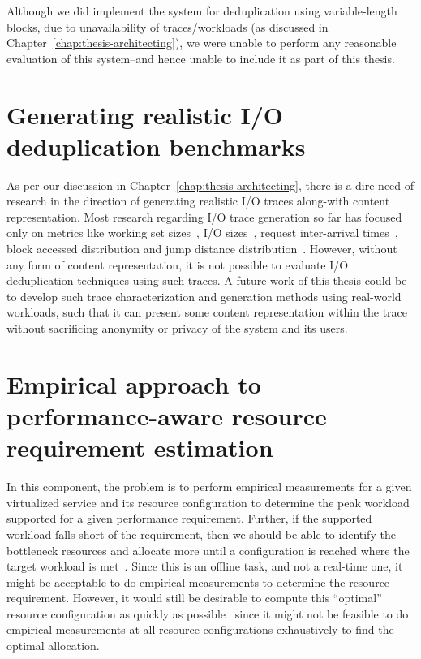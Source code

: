 Although we did implement the system for deduplication using
variable-length blocks, due to unavailability of traces/workloads (as 
discussed in Chapter~\ref{chap:thesis-architecting}), we were unable 
to perform any reasonable evaluation of this system--and hence unable 
to include it as part of this thesis.

\section{Generating realistic I/O deduplication benchmarks}
As per our discussion in Chapter~\ref{chap:thesis-architecting}, there
is a dire need of research in the direction of generating
realistic I/O traces along-with content representation. Most research
regarding I/O trace generation so far has focused only on metrics
like working set sizes~\cite{working-set}, 
I/O sizes~\cite{flexi-replay}, 
request inter-arrival times~\cite{storagereplay},
block accessed distribution and
jump distance distribution~\cite{jump-based-synthetic}. However, 
without any form of content representation, it is not possible
to evaluate I/O deduplication techniques using such traces. 
A future work of this thesis could be to develop such trace 
characterization and generation methods using real-world
workloads, such that it can present some
content representation within the trace without sacrificing 
anonymity or privacy of the system and its users.


\section{Empirical approach to performance-aware resource requirement 
estimation}

In this component, the problem is to perform empirical measurements
for a given virtualized service and its resource configuration to
determine the peak workload supported for a given performance
requirement. Further, if the supported workload falls short of the
requirement, then we should be able to identify the
bottleneck resources and allocate more until a configuration is
reached where the target workload is met~\cite{sandpiper}.
Since this is an offline task,
and not a real-time one, it might be acceptable to do empirical
measurements to determine
the resource requirement. However, it would still be
desirable to compute this ``optimal'' resource configuration
as quickly as possible~\cite{cutting-corners} since it might not be feasible to
do empirical measurements at all resource configurations exhaustively
to find the optimal allocation.

